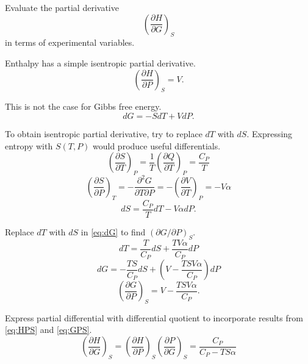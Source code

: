 \begin{@empty}
\begin{problem}
\end{problem}

\begin{problem}
    Evaluate the partial derivative
    \[ \left( \frac{\partial H}{\partial G} \right)_S \]
    in terms of experimental variables.
\end{problem}

\begin{answer}
    Enthalpy has a simple isentropic partial derivative.
    \begin{equation}
       \left( \frac{\partial H}{\partial P} \right)_S = V. \label{eq:HPS}
    \end{equation}

    This is not the case for Gibbs free energy.
    \begin{equation}
        dG = -SdT + VdP. \label{eq:dG}
    \end{equation}

    To obtain isentropic partial derivative, try to replace $dT$ with $dS$.
    Expressing entropy with $S(T, P)$ would produce useful differentials.
    \[
        \left( \frac{\partial S}{\partial T} \right)_P
        = \frac1T \left( \frac{\partial Q}{\partial T} \right)_P
        = \frac{C_P}{T}
    \]
    \[
        \left( \frac{\partial S}{\partial P} \right)_T
        = -\frac{\partial^2 G}{\partial T \partial P}
        = -\left( \frac{\partial V}{\partial T} \right)_P
        = -V \alpha
    \]
    \[ dS = \frac{C_P}{T} dT - V \alpha dP. \]

    Replace $dT$ with $dS$ in \eqref{eq:dG} to find
    $\left( \partial G / \partial P \right)_S$.
    \[ dT = \frac{T}{C_P} dS + \frac{TV\alpha}{C_P} dP \]
    \[ dG = -\frac{TS}{C_P} dS + \left( V - \frac{TSV\alpha}{C_P} \right) dP \]
    \begin{equation}
        \left( \frac{\partial G}{\partial P} \right)_S = V - \frac{TSV\alpha}{C_P}. \label{eq:GPS}
    \end{equation}

    Express partial differential with differential quotient to incorporate
    results from \eqref{eq:HPS} and \eqref{eq:GPS}.
    \[
        \left( \frac{\partial H}{\partial G} \right)_S
        = \left( \frac{\partial H}{\partial P} \right)_S \left( \frac{\partial P}{\partial G} \right)_S
        = \frac{C_P}{C_P - TS\alpha}
    \]
\end{answer}

\begin{problem}
\end{problem}


\end{@empty}
